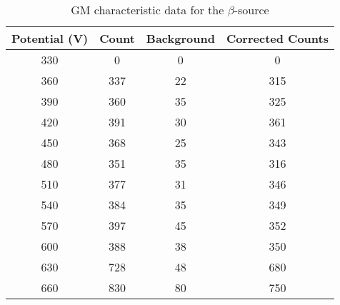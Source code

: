 \begin{table}[H]
    \centering
    \begin{tabular}{|c|c|c|c|}\hline
    Potential (V) & Count & Background & Corrected Counts \\ \hline
    330 & 0 & 0 & 0 \\
    360 & 337 & 22 & 315 \\
    390 & 360 & 35 & 325 \\
    420 & 391 & 30 & 361 \\
    450 & 368 & 25 & 343 \\
    480 & 351 & 35 & 316 \\
    510 & 377 & 31 & 346 \\
    540 & 384 & 35 & 349 \\
    570 & 397 & 45 & 352 \\
    600 & 388 & 38 & 350 \\
    630 & 728 & 48 & 680 \\
    660 & 830 & 80 & 750 \\\hline
    \end{tabular}
    \caption{GM characteristic data for the $\beta$-source}
    \label{t1}
\end{table}